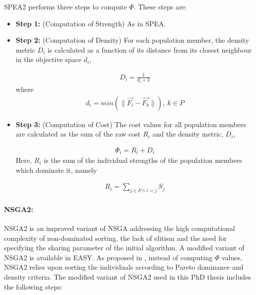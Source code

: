 SPEA2 performs three steps to compute $\Phi$. These steps are:

\begin{itemize}
\item[]{\bf Step 1:}  (Computation of Strength) As in SPEA.

\item[]{\bf Step 2:}  (Computation of Density) For each population member, the density metric $D_i$ is calculated  as a function of its distance from its closest neighbour in the objective space $d_i$,

\begin{eqnarray}
	D_i = \frac{1} {d_i+2} 
\end{eqnarray}
where
\begin{eqnarray}
	\nonumber
	d_i= min (\parallel \vec{F_i} - \vec{F_k} \parallel), ~ k \in P  
\end{eqnarray}


\item[]{\bf Step 3:}  (Computation of Cost) The cost values for all population members are calculated as the sum of the raw cost $R_i$ and the density metric, $D_i$,

\begin{eqnarray}
	\Phi_i = R_i+D_i
\label{SPEAIIeq}
\end{eqnarray}
Here, $R_i$ is the sum of the individual strengths of the population members which dominate it, namely
  
\begin{eqnarray}
	\nonumber
	R_i=\sum _{j \in P \wedge i \prec j}S_j 
\end{eqnarray}  
\end{itemize}

\paragraph{NSGA2:} 
NSGA2 \cite{Deb00a} is an improved variant of NSGA \cite{Sri1995} addressing the high computational complexity of non-dominated sorting, the lack of elitism and the need for specifying the sharing parameter of the initial algorithm. A modified variant of NSGA2 is available in EASY. As proposed in \cite{Deb00a}, instead of computing $\Phi$ values, NSGA2 relies upon sorting the individuals according to Pareto dominance and density criteria. The modified variant of NSGA2 used in this PhD thesis includes the following steps:    


